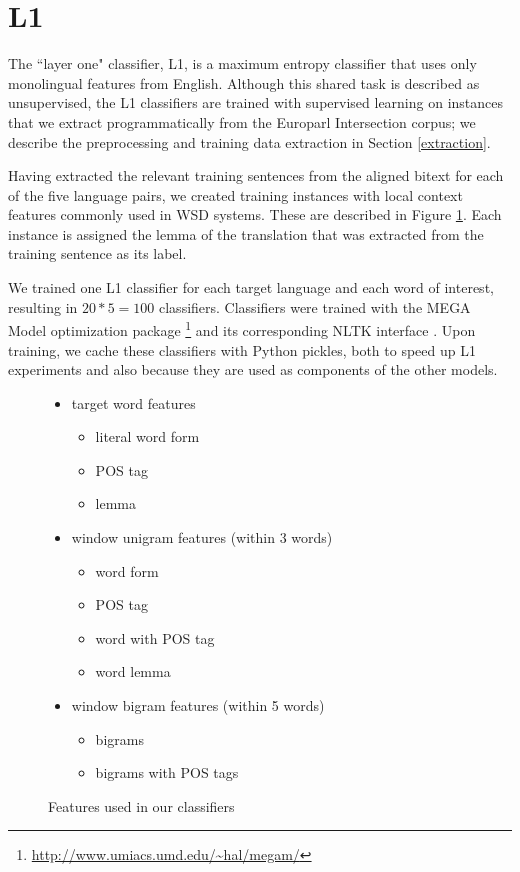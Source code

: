 \documentclass[11pt,letterpaper]{article}
\begin{document}
\section{L1}
The ``layer one" classifier, L1, is a maximum entropy classifier that
uses only monolingual features from English. Although this shared task is
described as unsupervised, the L1 classifiers are trained with supervised
learning on instances that we extract programmatically from the Europarl
Intersection corpus; we describe the preprocessing and training data extraction
in Section \ref{extraction}.

Having extracted the relevant training sentences from the aligned bitext for
each of the five language pairs, we created training instances with local
context features commonly used in WSD systems. These are described in Figure
\ref{fig:features}. Each instance is assigned the lemma of the translation that
was extracted from the training sentence as its label.

We trained one L1 classifier for each target language and each word of
interest, resulting in $20*5 = 100$ classifiers. Classifiers were trained with
the MEGA Model optimization package
\footnote{\url{http://www.umiacs.umd.edu/~hal/megam/}} and its corresponding
NLTK interface \cite{nltkbook}. Upon training, we cache these classifiers with
Python pickles, both to speed up L1 experiments and also because they are used
as components of the other models.

\begin{figure}
  \begin{framed}
  \begin{itemize}  %
  \item target word features
  \begin{itemize}  %
       \item literal word form
       \item POS tag
       \item lemma
  \end{itemize}
  \item window unigram features (within 3 words)
  \begin{itemize} %
  		\item word form
  		\item POS tag
  		\item word with POS tag
  		\item word lemma
  \end{itemize}
  \item window bigram features (within 5 words)
  \begin{itemize} %
  		\item bigrams 
  		\item bigrams with POS tags
  \end{itemize}  
  \end{itemize}   %
  \end{framed}
  \vspace{-1em}
  \caption{Features used in our classifiers}
  \label{fig:features}
\end{figure}
\end{document}
